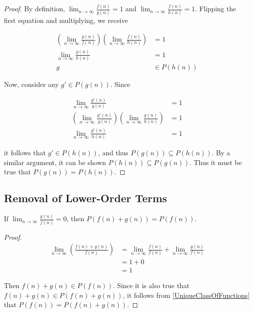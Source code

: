 \begin{proof}
	By definition, $\lim_{n \to \infty} \frac{f(n)}{g(n)} = 1$ and $\lim_{n \to \infty} \frac{f(n)}{h(n)} = 1$. Flipping the first equation and multiplying, we receive
	
	\begin{align*}
	\left( \lim_{n \to \infty} \frac {g(n)} {f(n)} \right) \left( \lim_{n \to \infty} \frac {f(n)} {h(n)} \right) &= 1\\
	\lim_{n \to \infty} \frac {g(n)} {h(n)} &= 1\\
	g &\in P(h(n))
	\end{align*}
	
	Now, consider any $g' \in P(g(n))$. Since
	
	\begin{align*}
	\lim_{n \to \infty} \frac {g'(n)} {g(n)} &= 1\\
	\left( \lim_{n \to \infty} \frac {g'(n)} {g(n)} \right) \left( \lim_{n \to \infty} \frac{g(n)}{h(n)} \right) &= 1\\
	\lim_{n \to \infty} \frac{g'(n)}{h(n)} &= 1
	\end{align*}
	
	it follows that $g' \in P(h(n))$, and thus $P(g(n)) \subseteq P(h(n))$. By a similar argument, it can be shown $P(h(n)) \subseteq P(g(n))$. Thus it must be true that $P(g(n)) = P(h(n))$.
\end{proof}

\subsection{Removal of Lower-Order Terms}
\label{RemovesLowerOrderTerms}

\begin{theorem}
	If $\lim_{n \to \infty} \frac{g(n)}{f(n)} = 0$, then $P(f(n) + g(n)) = P(f(n))$.
\end{theorem}

\begin{proof}
	\begin{align*}
	\lim_{n \to \infty} \left( \frac{f(n) + g(n)}{f(n)} \right) &= \lim_{n \to \infty} \frac{f(n)}{f(n)} + \lim_{n \to \infty} \frac{g(n)}{f(n)}\\
	&= 1 + 0\\
	&= 1
	\end{align*}
	
	Then $f(n) + g(n) \in P(f(n))$. Since it is also true that $f(n) + g(n) \in P(f(n) + g(n))$, it follows from \ref{UniqueClassOfFunctions} that $P(f(n)) = P(f(n) + g(n))$.
\end{proof}